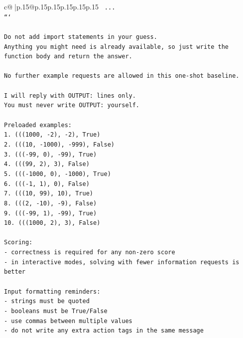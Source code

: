 \documentclass{article}
\begin{document}
{\begin{supertabular}{c@{$\;$}|p{.15\linewidth}@{}p{.15\linewidth}p{.15\linewidth}p{.15\linewidth}p{.15\linewidth}p{.15\linewidth}}
{{{\texttt{    ...} \\
\texttt{```} \\
\\ 
\texttt{Do not add import statements in your guess.} \\
\texttt{Anything you might need is already available, so just write the function body and return the answer.} \\
\\ 
\texttt{No further example requests are allowed in this one{-}shot baseline.} \\
\\ 
\texttt{I will reply with OUTPUT: lines only.} \\
\texttt{You must never write OUTPUT: yourself.} \\
\\ 
\texttt{Preloaded examples:} \\
\texttt{1. (((1000, {-}2), {-}2), True)} \\
\texttt{2. (((10, {-}1000), {-}999), False)} \\
\texttt{3. ((({-}99, 0), {-}99), True)} \\
\texttt{4. (((99, 2), 3), False)} \\
\texttt{5. ((({-}1000, 0), {-}1000), True)} \\
\texttt{6. ((({-}1, 1), 0), False)} \\
\texttt{7. (((10, 99), 10), True)} \\
\texttt{8. (((2, {-}10), {-}9), False)} \\
\texttt{9. ((({-}99, 1), {-}99), True)} \\
\texttt{10. (((1000, 2), 3), False)} \\
\\ 
\texttt{Scoring:} \\
\texttt{{-} correctness is required for any non{-}zero score} \\
\texttt{{-} in interactive modes, solving with fewer information requests is better} \\
\\ 
\texttt{Input formatting reminders:} \\
\texttt{{-} strings must be quoted} \\
\texttt{{-} booleans must be True/False} \\
\texttt{{-} use commas between multiple values} \\
\texttt{{-} do not write any extra action tags in the same message} \\
\\ 
}}}
\end{supertabular}}
\end{document}

